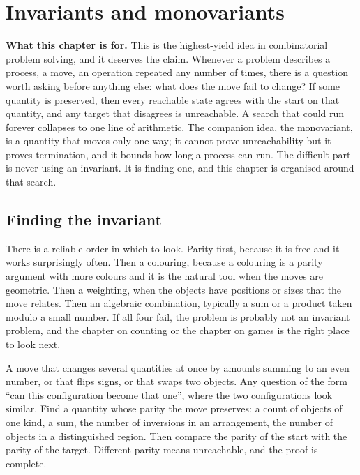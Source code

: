 \chapter{Invariants and monovariants}

\begin{orient}
\textbf{What this chapter is for.} This is the highest-yield idea in combinatorial problem solving, and it deserves the claim. Whenever a problem describes a process, a move, an operation repeated any number of times, there is a question worth asking before anything else: what does the move fail to change? If some quantity is preserved, then every reachable state agrees with the start on that quantity, and any target that disagrees is unreachable. A search that could run forever collapses to one line of arithmetic. The companion idea, the monovariant, is a quantity that moves only one way; it cannot prove unreachability but it proves termination, and it bounds how long a process can run. The difficult part is never using an invariant. It is finding one, and this chapter is organised around that search.
\end{orient}

\section{Finding the invariant}

There is a reliable order in which to look. Parity first, because it is free and it works surprisingly often. Then a colouring, because a colouring is a parity argument with more colours and it is the natural tool when the moves are geometric. Then a weighting, when the objects have positions or sizes that the move relates. Then an algebraic combination, typically a sum or a product taken modulo a small number. If all four fail, the problem is probably not an invariant problem, and the chapter on counting or the chapter on games is the right place to look next.

\cue A move that changes several quantities at once by amounts summing to an even number, or that flips signs, or that swaps two objects. Any question of the form ``can this configuration become that one'', where the two configurations look similar.
\method Find a quantity whose parity the move preserves: a count of objects of one kind, a sum, the number of inversions in an arrangement, the number of objects in a distinguished region. Then compare the parity of the start with the parity of the target. Different parity means unreachable, and the proof is complete.

